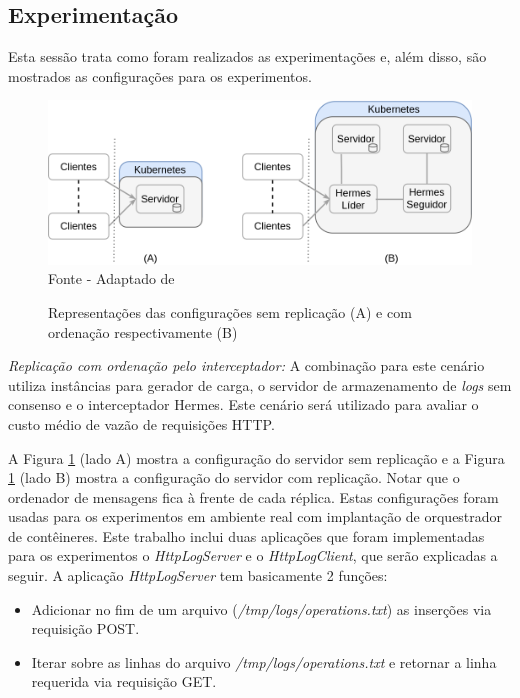 \subsection{Experimentação}

Esta sessão trata como foram realizados as experimentações e, além disso, são mostrados as configurações para os experimentos.

\begin{figure}[htb!]
\centering
\caption{Representações das configurações sem replicação (A) e com ordenação respectivamente (B)}
\includegraphics[width=\linewidth]{figures/confiuracoes-kubernetes.drawio.png}
{\flushleft Fonte - Adaptado de \textcite{renan2021hermes}}
\label{fig:arquitetura-cluster-ordenadores}
\end{figure}

\textit{Replicação com ordenação pelo interceptador:} A combinação para este cenário utiliza instâncias para gerador de carga, o servidor de armazenamento de \textit{logs}
sem consenso e o interceptador Hermes. Este cenário será utilizado para avaliar o custo médio de vazão de requisições HTTP.

\pagebreak

A Figura \ref{fig:arquitetura-cluster-ordenadores} (lado A) mostra a configuração do servidor sem replicação e a Figura \ref{fig:arquitetura-cluster-ordenadores} (lado B) mostra a configuração do servidor com replicação. Notar que o ordenador de mensagens fica à frente de cada réplica. Estas configurações foram usadas para os experimentos em ambiente real com implantação de orquestrador de contêineres. Este trabalho inclui duas aplicações que foram implementadas para os experimentos o \textit{HttpLogServer} e o \textit{HttpLogClient}, que serão explicadas a seguir. A aplicação \textit{HttpLogServer} tem basicamente 2 funções:

\begin{itemize}
\item Adicionar no fim de um arquivo (\textit{/tmp/logs/operations.txt}) as inserções via requisição POST.
\item Iterar sobre as linhas do arquivo \textit{/tmp/logs/operations.txt} e retornar a linha requerida via requisição GET.
\end{itemize}

